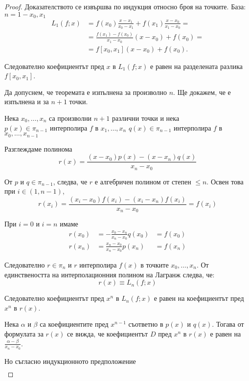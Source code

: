 \documentclass[12pt]{article}
\numberwithin{equation}{section}
\numberwithin{theorem}{section}
\numberwithin{definition}{section}
\numberwithin{corollary}{section}
\begin{document}
\begin{proof}
Доказателството се извършва по индукция относно броя на точките.
База: $n = 1 - x_0,x_1$
\begin{align*}
L_1(f;x) &= f(x_0)\frac{x - x_1}{x_0 - x_1} + f(x_1)\frac{x - x_0}{x_1 - x_0} =\\ &= \frac{f(x_1) - f(x_0)}{x_1 - x_0}(x - x_0) + f(x_0) =\\ &= f[x_0, x_1](x - x_0) + f(x_0).
\end{align*}
\par
Следователно коефициентът пред $x$ в $L_1(f;x)$ е равен на разделената разлика $f[x_0, x_1]$. 
\par
Да допуснем, че теоремата е изпълнена за произволно $n$. Ще докажем, че е изпълнена и за $n+1$ точки.
\par
Нека $x_0, \dotso, x_n$ са произволни $n+1$ различни точки и нека\\
\hspace{20pt} $p(x) \in \pi_{n-1}$ интерполира $f$ в $x_1, \dotso, x_n$
\hspace{20pt} $q(x) \in \pi_{n-1}$ интерполира $f$ в $x_0, \dotso, x_{n-1}$
\par
Разглеждаме полинома 
\[
r(x) = \frac{(x - x_0)p(x) - (x - x_n)q(x)}{x_n - x_0}
\]
\par
От $p$ и $q \in \pi_{n-1}$, следва, че $r$ е алгебричен полином от степен $\leq n$. Освен това при $i\in(1,n-1)$,
\[
r(x_i) = \frac{(x_i - x_0)f(x_i) - (x_i - x_n)f(x_i)}{x_n - x_0} = f(x_i)
\]
\par
При $i = 0$ и $i = n$ имаме
\begin{align*}
r(x_0) &= -\frac{x_0 - x_n}{x_n - x_0}q(x_0) &= f(x_0)\\
r(x_n) &= \frac{x_n - x_0}{x_n - x_0}p(x_n) &= f(x_n)
\end{align*}
\par
Следователно $r \in \pi_n$ и $r$ интерполира $f(x)$ в точките $x_0, \dotso, x_n$. От единствеността на интерполационния полином на Лагранж следва, че:
\[
r(x) \equiv L_n(f;x)
\]
\par
Следователно коефициентът пред $x^n$ в $L_n(f;x)$ е равен на коефициентът пред $x^n$ в $r(x)$.
\par
Нека $\alpha$ и $\beta$ са коефициентите пред $x^{n-1}$ съответно в $p(x)$ и $q(x)$. Тогава от формулата за $r(x)$ се вижда, че коефициентът $D$ пред $x^n$ в $r(x)$ е равен на $\frac{\alpha - \beta}{x_n - x_0}$.
\par
Но съгласно индукционното предположение 
\begin{align*}

\end{align*}
\end{proof}
\end{document}
